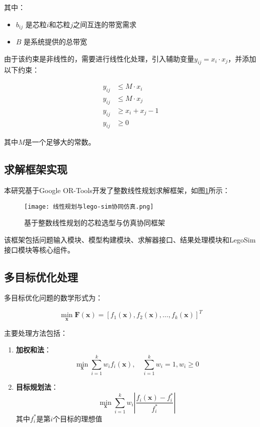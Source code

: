 \documentclass[bachelor]{thesis-uestc}
\begin{document}
其中：
\begin{itemize}
    \item $b_{ij}$ 是芯粒$i$和芯粒$j$之间互连的带宽需求
    \item $B$ 是系统提供的总带宽
\end{itemize}

由于该约束是非线性的，需要进行线性化处理，引入辅助变量$y_{ij} = x_i \cdot x_j$，并添加以下约束：

\begin{align}
y_{ij} &\leq M \cdot x_i \\
y_{ij} &\leq M \cdot x_j \\
y_{ij} &\geq x_i + x_j - 1 \\
y_{ij} &\geq 0
\end{align}

其中$M$是一个足够大的常数。

\subsection{求解框架实现}

本研究基于Google OR-Tools开发了整数线性规划求解框架，如图\ref{fig:ilp_framework}所示：

\begin{figure}[htbp]
    \centering
    \texttt{[image: 线性规划与lego-sim协同仿真.png]}
    \caption{基于整数线性规划的芯粒选型与仿真协同框架}
    \label{fig:ilp_framework}
\end{figure}

该框架包括问题输入模块、模型构建模块、求解器接口、结果处理模块和LegoSim接口模块等核心组件。





\subsection{多目标优化处理}

多目标优化问题的数学形式为：

\begin{equation}
\min_{\mathbf{x}} \mathbf{F}(\mathbf{x}) = [f_1(\mathbf{x}), f_2(\mathbf{x}), \ldots, f_k(\mathbf{x})]^T
\end{equation}

主要处理方法包括：

\begin{enumerate}
    \item \textbf{加权和法}：
    \begin{equation}
    \min_{\mathbf{x}} \sum_{i=1}^{k} w_i f_i(\mathbf{x}), \quad \sum_{i=1}^{k} w_i = 1, w_i \geq 0
    \end{equation}
    
    
    \item \textbf{目标规划法}：
    \begin{equation}
    \min_{\mathbf{x}} \sum_{i=1}^{k} w_i \left|\frac{f_i(\mathbf{x}) - f_i^*}{f_i^*}\right|
    \end{equation}
    其中$f_i^*$是第$i$个目标的理想值
\end{enumerate}
\end{document}

